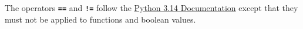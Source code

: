 The operators
    \texttt{\textbf{==}} and
    \texttt{\textbf{!=}}
    follow the 
    \href{https://docs.python.org/3.14}{\color{DarkBlue}Python 3.14 Documentation}
    except that they must not be applied to functions and boolean values.
    
